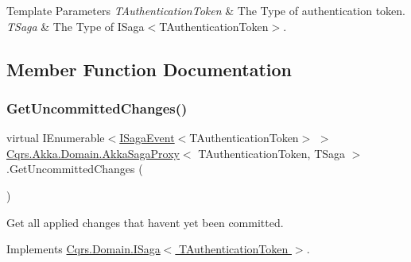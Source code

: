 \begin{DoxyTemplParams}{Template Parameters}
{\em T\+Authentication\+Token} & The Type of authentication token.\\
\hline
{\em T\+Saga} & The Type of I\+Saga$<$\+T\+Authentication\+Token$>$.\\
\hline
\end{DoxyTemplParams}


\subsection{Member Function Documentation}
\mbox{\label{classCqrs_1_1Akka_1_1Domain_1_1AkkaSagaProxy_a8cad3415bc5474a01bfdb2db3a852ea5_a8cad3415bc5474a01bfdb2db3a852ea5}} 
\subsubsection{\texorpdfstring{Get\+Uncommitted\+Changes()}{GetUncommittedChanges()}}
{\footnotesize\ttfamily virtual I\+Enumerable$<$\hyperlink{interfaceCqrs_1_1Events_1_1ISagaEvent}{I\+Saga\+Event}$<$T\+Authentication\+Token$>$ $>$ \hyperlink{classCqrs_1_1Akka_1_1Domain_1_1AkkaSagaProxy}{Cqrs.\+Akka.\+Domain.\+Akka\+Saga\+Proxy}$<$ T\+Authentication\+Token, T\+Saga $>$.Get\+Uncommitted\+Changes (\begin{DoxyParamCaption}{ }\end{DoxyParamCaption})\hspace{0.3cm}{\ttfamily [virtual]}}



Get all applied changes that haven\textquotesingle{}t yet been committed. 



Implements \hyperlink{interfaceCqrs_1_1Domain_1_1ISaga_abb77811b4f7d19adb61f9d33da18e7e0_abb77811b4f7d19adb61f9d33da18e7e0}{Cqrs.\+Domain.\+I\+Saga$<$ T\+Authentication\+Token $>$}.

\mbox{\label{classCqrs_1_1Akka_1_1Domain_1_1AkkaSagaProxy_a959a64faad2d1a8f912c08362adab668_a959a64faad2d1a8f912c08362adab668}} 
